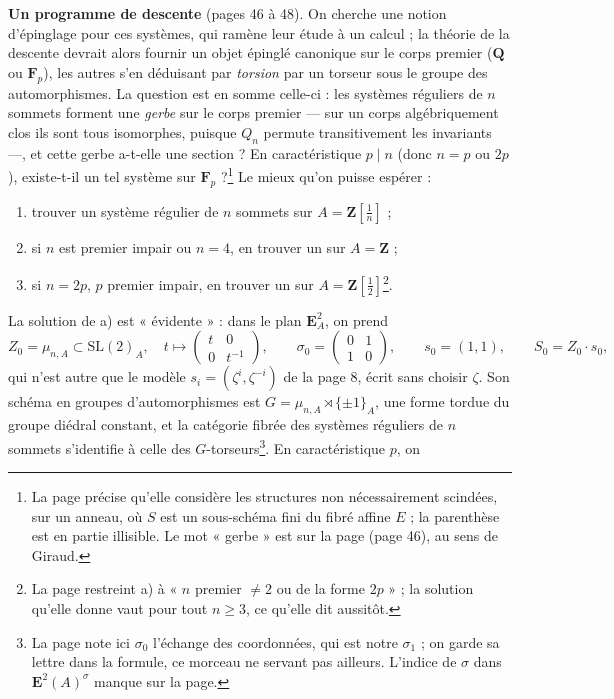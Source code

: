 \documentclass[11pt,a4paper]{article}
\begin{document}
\textbf{Un programme de descente} (pages 46 à 48). On cherche une notion
d'épinglage pour ces systèmes, qui ramène leur étude à un calcul ; la théorie
de la descente devrait alors fournir un objet épinglé canonique sur le corps
premier ($\mathbf{Q}$ ou $\mathbf{F}_p$), les autres s'en déduisant par
\emph{torsion} par un torseur sous le groupe des automorphismes. La question
est en somme celle-ci : les systèmes réguliers de $n$ sommets forment une
\emph{gerbe} sur le corps premier --- sur un corps algébriquement clos ils sont
tous isomorphes, puisque $Q_n$ permute transitivement les invariants ---, et
cette gerbe a-t-elle une section ? En caractéristique $p \mid n$ (donc $n = p$
ou $2p$), existe-t-il un tel système sur $\mathbf{F}_p$ ?\footnote{La page
précise qu'elle considère les structures non nécessairement scindées, sur un
anneau, où $S$ est un sous-schéma fini du fibré affine $E$ ; la parenthèse est
en partie illisible. Le mot « gerbe » est sur la page (page 46), au sens de
Giraud.} Le mieux qu'on puisse espérer :
\begin{enumerate}
  \item[a)] trouver un système régulier de $n$ sommets sur $A =
    \mathbf{Z}[\frac1n]$ ;
  \item[b)] si $n$ est premier impair ou $n = 4$, en trouver un sur $A =
    \mathbf{Z}$ ;
  \item[c)] si $n = 2p$, $p$ premier impair, en trouver un sur $A =
    \mathbf{Z}[\frac12]$\footnote{La page restreint a) à « $n$ premier $\neq
    2$ ou de la forme $2p$ » ; la solution qu'elle donne vaut pour tout $n
    \geq 3$, ce qu'elle dit aussitôt.}.
\end{enumerate}
La solution de a) est « évidente » : dans le plan $\mathbf{E}^2_A$, on prend
\[
  Z_0 = \mu_{n,A} \subset \mathrm{SL}(2)_A, \quad t \mapsto
  \begin{pmatrix} t & 0 \\ 0 & t^{-1} \end{pmatrix}, \qquad
  \sigma_0 = \begin{pmatrix} 0 & 1 \\ 1 & 0 \end{pmatrix}, \qquad
  s_0 = (1, 1), \qquad S_0 = Z_0 \cdot s_0 ,
\]
qui n'est autre que le modèle $s_i = (\zeta^i, \zeta^{-i})$ de la page 8, écrit
sans choisir $\zeta$. Son schéma en groupes d'automorphismes est $G =
\mu_{n,A} \rtimes \{\pm 1\}_A$, une forme tordue du groupe diédral constant, et
la catégorie fibrée des systèmes réguliers de $n$ sommets s'identifie à celle
des $G$-torseurs\footnote{La page note ici $\sigma_0$ l'échange des
coordonnées, qui est notre $\sigma_1$ ; on garde sa lettre dans la formule,
ce morceau ne servant pas ailleurs. L'indice de $\sigma$ dans
$\mathbf{E}^2(A)^{\sigma}$ manque sur la page.}. En caractéristique $p$, on
\end{document}
